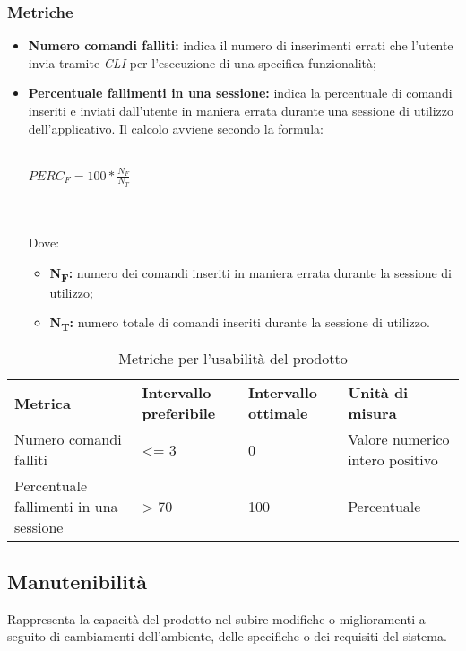 \subsubsection{Metriche}
\begin{itemize}
	\item \textbf{Numero comandi falliti:} indica il numero di inserimenti errati che l'utente invia tramite \textit{CLI\glos} per l'esecuzione di una specifica funzionalità;
	\item \textbf{Percentuale fallimenti in una sessione:} indica la percentuale di comandi inseriti e inviati dall'utente in maniera errata durante una sessione di utilizzo dell'applicativo. Il calcolo avviene secondo la formula:\\\\
	\centerline{
		\begin{math}
		PERC_{F}=100*\frac{N_{F}}{N_T}
		\end{math}
	}
	\\\\Dove:
	\begin{itemize}
		\item \textbf{N\textsubscript{F}:} numero dei comandi inseriti in maniera errata durante la sessione di utilizzo;
		\item \textbf{N\textsubscript{T}:} numero totale di comandi inseriti durante la sessione di utilizzo.
	\end{itemize}	
\end{itemize}

\renewcommand{\arraystretch}{2.2}
\begin{longtable}{|C{4.5cm}|C{2.25cm}|C{2.25cm}|C{3cm}|}
	
	\caption{Metriche per l'usabilità del prodotto}\\
	\hline
	
	\textbf{Metrica} & \textbf{Intervallo preferibile}  & \textbf{Intervallo ottimale} & \textbf{Unità di misura}
	\tabularnewline
	\endfirsthead
	
	Numero comandi falliti &  <= 3 & 0 & Valore numerico intero positivo \\ 
	Percentuale fallimenti in una sessione &  > 70 & 100 & Percentuale \\ 
\end{longtable}



\subsection{Manutenibilità}
Rappresenta la capacità del prodotto nel subire modifiche o miglioramenti a seguito di cambiamenti dell'ambiente, delle specifiche o dei requisiti del sistema.
